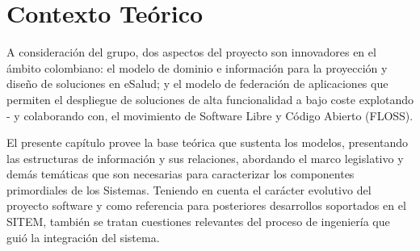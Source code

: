 \chapter{Contexto Teórico}

A consideración del grupo, dos aspectos del proyecto son innovadores en el ámbito colombiano: el modelo de dominio e información para la proyección y diseño de soluciones en eSalud; y el modelo de federación de aplicaciones que permiten el despliegue de soluciones de alta funcionalidad a bajo coste explotando - y colaborando con, el movimiento de Software Libre y Código Abierto (FLOSS).

El presente capítulo provee la base teórica que sustenta los modelos, presentando las estructuras de información y sus relaciones, abordando el marco legislativo y demás temáticas que son necesarias para caracterizar los componentes primordiales de los Sistemas. Teniendo en cuenta el carácter evolutivo del proyecto software y como referencia para posteriores desarrollos soportados en el SITEM, también se tratan cuestiones relevantes del proceso de ingeniería que guió la integración del sistema.






